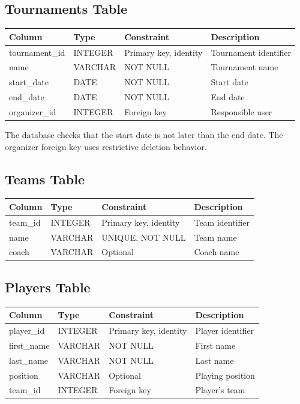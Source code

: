 \documentclass[12pt,a4paper]{article}
\begin{document}
\subsection{Tournaments Table}

\begin{longtable}{p{3.0cm}p{3.0cm}p{4.0cm}p{4.0cm}}
\toprule
\textbf{Column} & \textbf{Type} & \textbf{Constraint} & \textbf{Description}\\
\midrule
\endhead
tournament\_id & INTEGER & Primary key, identity & Tournament identifier\\
name & VARCHAR & NOT NULL & Tournament name\\
start\_date & DATE & NOT NULL & Start date\\
end\_date & DATE & NOT NULL & End date\\
organizer\_id & INTEGER & Foreign key & Responsible user\\
\bottomrule
\end{longtable}

The database checks that the start date is not later than the end
date. The organizer foreign key uses restrictive deletion behavior.

\subsection{Teams Table}

\begin{longtable}{p{3.0cm}p{3.0cm}p{4.0cm}p{4.0cm}}
\toprule
\textbf{Column} & \textbf{Type} & \textbf{Constraint} & \textbf{Description}\\
\midrule
\endhead
team\_id & INTEGER & Primary key, identity & Team identifier\\
name & VARCHAR & UNIQUE, NOT NULL & Team name\\
coach & VARCHAR & Optional & Coach name\\
\bottomrule
\end{longtable}

\subsection{Players Table}

\begin{longtable}{p{3.0cm}p{3.0cm}p{4.0cm}p{4.0cm}}
\toprule
\textbf{Column} & \textbf{Type} & \textbf{Constraint} & \textbf{Description}\\
\midrule
\endhead
player\_id & INTEGER & Primary key, identity & Player identifier\\
first\_name & VARCHAR & NOT NULL & First name\\
last\_name & VARCHAR & NOT NULL & Last name\\
position & VARCHAR & Optional & Playing position\\
team\_id & INTEGER & Foreign key & Player's team\\
\bottomrule
\end{longtable}
\end{document}
